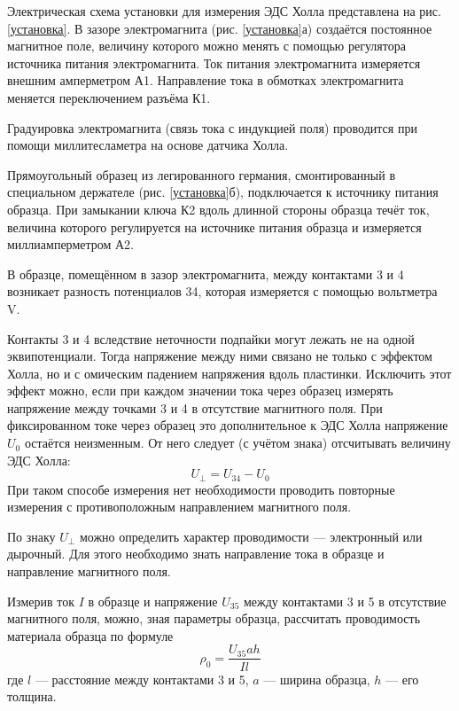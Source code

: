 \documentclass[a4paper,12pt]{article} %
\begin{document}
Электрическая схема установки для измерения ЭДС Холла представлена на рис. \ref{установка}. В зазоре электромагнита (рис. \ref{установка}а) создаётся постоянное
магнитное поле, величину которого можно менять с помощью регулятора источника питания электромагнита. Ток питания электромагнита измеряется внешним амперметром А1.
Направление тока в обмотках электромагнита меняется переключением
разъёма К1.

Градуировка электромагнита (связь тока с индукцией поля) проводится при помощи миллитесламетра на основе датчика Холла.

Прямоугольный образец из легированного германия, смонтированный в специальном держателе (рис. \ref{установка}б), подключается к источнику питания образца. При замыкании ключа К2 вдоль длинной стороны образца
течёт ток, величина которого регулируется на источнике питания образца и измеряется миллиамперметром А2.

В образце, помещённом в зазор электромагнита, между контактами 3
и 4 возникает разность потенциалов 34, которая измеряется с помощью
вольтметра V.

Контакты 3 и 4 вследствие неточности подпайки могут лежать не на
одной эквипотенциали. Тогда напряжение между ними связано не только с эффектом Холла, но и с омическим падением напряжения вдоль
пластинки. Исключить этот эффект можно, если при каждом значении тока через образец измерять напряжение между точками 3 и 4 в отсутствие магнитного поля. При фиксированном токе через образец это дополнительное к ЭДС Холла напряжение $U_0$ остаётся неизменным. От него следует (с учётом знака)
отсчитывать величину ЭДС Холла:
\begin{equation}
U_\perp = U_{34} - U_0
\end{equation}
При таком способе измерения нет необходимости проводить повторные
измерения с противоположным направлением магнитного поля.

По знаку $U_\perp$ можно определить характер проводимости — электронный или дырочный. Для этого необходимо знать направление тока в
образце и направление магнитного поля.

Измерив ток $I$ в образце и напряжение $U_{35}$ между контактами 3 и 5
в отсутствие магнитного поля, можно, зная параметры образца, рассчитать проводимость материала образца по формуле
\begin{equation}
\rho_0=\frac{U_{35}ah}{Il}
\end{equation}
где $l$ — расстояние между контактами 3 и 5, $a$ — ширина образца, $h$ —
его толщина.
\end{document}

